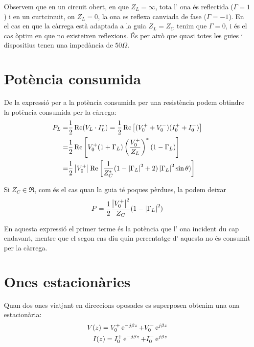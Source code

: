 Observem que en un circuit obert, en que $Z_L = \infty$, tota l' ona és reflectida ($\Gamma = 1$) i en un curtcircuit, on $Z_L = 0$, la ona es reflexa canviada de fase ($\Gamma = -1$). En el cas en que la càrrega està adaptada a la guia $Z_L = Z_C$ tenim que $\Gamma = 0$, i és el cas òptim en que no existeixen reflexions. És per això que quasi totes les guies i dispositius tenen una impedància de $50 \Omega$.

\section{Potència consumida}

De la expressió per a la potència consumida per una resistència podem obtindre la potència consumida per la càrrega:
\begin{equation}
 \begin{split}
    P_L =& \frac{1}{2} \operatorname {Re} (V_L \cdot I_L ^*) = \frac{1}{2} \operatorname {Re} \left [ (V_0 ^+ + V_0 ^-)(I_0 ^+ + I_0 ^-) \right]  \nonumber \\
  = &\frac{1}{2} \operatorname {Re} \left [ V_0 ^+ (1+\Gamma _L) \left ( \frac{V_0 ^+}{Z_L} \right ) ^ * (1- \Gamma _L) \right] \nonumber \\
  = &\frac{1}{2} \left\rvert V_0 ^+ \right\lvert \operatorname {Re} \left [ \frac{1}{Z_C ^*}(1 - \left\rvert  \Gamma_L  \right\lvert ^2 + 2)\left\rvert \Gamma _L \right\lvert ^2\sin \theta) \right]
  \end{split}
\end{equation}

Si $Z_C \in \Re$, com és el cas quan la guia té poques pèrdues, la podem deixar
\begin{equation}
  \label{eq:pot}
  P = \frac{1}{2} \frac{\left\rvert V_0 ^+ \right\lvert ^2}{Z_C} (1 - \left\rvert \Gamma_L \right\lvert ^2)
\end{equation}

En aquesta expressió el primer terme és la potència que l' ona incident du cap endavant, mentre que el segon ens diu quin percentatge d' aquesta no és consumit per la càrrega.

\section{Ones estacionàries}

Quan dos ones viatjant en direccions oposades es superposen obtenim una ona estacionària:
\begin{subequations}
  \begin{align}
    V(z) = V_0 ^+ \operatorname{e}^{- j \beta z} + V_0 ^- \operatorname{e}^{ j \beta z} \\
    I(z) = I_0 ^+ \operatorname{e}^{- j \beta z} + I_0 ^- \operatorname{e}^{ j \beta z}
  \end{align}
\end{subequations}

